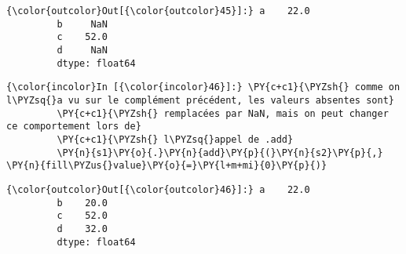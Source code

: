 \begin{Verbatim}[commandchars=\\\{\}]
{\color{outcolor}Out[{\color{outcolor}45}]:} a    22.0
         b     NaN
         c    52.0
         d     NaN
         dtype: float64
\end{Verbatim}
            
    \begin{Verbatim}[commandchars=\\\{\}]
{\color{incolor}In [{\color{incolor}46}]:} \PY{c+c1}{\PYZsh{} comme on l\PYZsq{}a vu sur le complément précédent, les valeurs absentes sont}
         \PY{c+c1}{\PYZsh{} remplacées par NaN, mais on peut changer ce comportement lors de}
         \PY{c+c1}{\PYZsh{} l\PYZsq{}appel de .add}
         \PY{n}{s1}\PY{o}{.}\PY{n}{add}\PY{p}{(}\PY{n}{s2}\PY{p}{,} \PY{n}{fill\PYZus{}value}\PY{o}{=}\PY{l+m+mi}{0}\PY{p}{)}
\end{Verbatim}


\begin{Verbatim}[commandchars=\\\{\}]
{\color{outcolor}Out[{\color{outcolor}46}]:} a    22.0
         b    20.0
         c    52.0
         d    32.0
         dtype: float64
\end{Verbatim}
            

